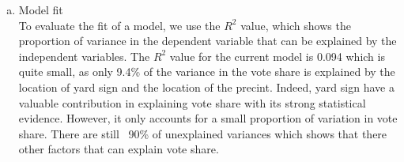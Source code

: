 \documentclass[12pt,letterpaper]{article}
\begin{document}
\begin{enumerate} [(a)]
		\item Model fit\\
		To evaluate the fit of a model, we use the $\textit{R}^2$ value, which shows the proportion of variance in the dependent variable that can be explained by the independent variables. The $\textit{R}^2$ value for the current model is 0.094 which is quite small, as only 9.4\% of the variance in the vote share is explained by the location of yard sign and the location of the precint. Indeed, yard sign have a valuable contribution in explaining vote share with its strong statistical evidence. However, it only accounts for a small proportion of variation in vote share. There are still ~90\% of unexplained variances which shows that there other factors that can explain vote share.
	\end{enumerate}
\end{document}
